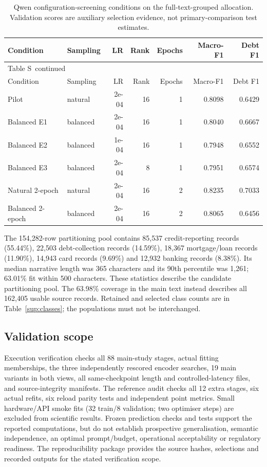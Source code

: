 \documentclass[10pt,a4paper]{article}
\renewcommand{\thetable}{S\arabic{table}}
\begin{document}
{\small
\setlength{\tabcolsep}{4pt}
\begin{longtable}{@{}llrrrrr@{}}
\caption{Qwen configuration-screening conditions on the full-text-grouped allocation. Validation scores are auxiliary selection evidence, not primary-comparison test estimates.}\label{sup:historical-selection}\\
\toprule
Condition & Sampling & LR & Rank & Epochs & Macro-F1 & Debt F1 \\
\midrule\endfirsthead
\multicolumn{7}{l}{\small Table \thetable\ continued}\\
\toprule
Condition & Sampling & LR & Rank & Epochs & Macro-F1 & Debt F1 \\
\midrule\endhead
\bottomrule\endfoot
Pilot & natural & 2e-04 & 16 & 1 & 0.8098 & 0.6429 \\
Balanced E1 & balanced & 2e-04 & 16 & 1 & 0.8040 & 0.6667 \\
Balanced E2 & balanced & 1e-04 & 16 & 1 & 0.7948 & 0.6552 \\
Balanced E3 & balanced & 2e-04 & 8 & 1 & 0.7951 & 0.6574 \\
Natural 2-epoch & natural & 2e-04 & 16 & 2 & 0.8235 & 0.7033 \\
Balanced 2-epoch & balanced & 2e-04 & 16 & 2 & 0.8065 & 0.6456 \\
\end{longtable}
}


The 154,282-row partitioning pool contains 85,537 credit-reporting records (55.44\%), 22,503 debt-collection records (14.59\%), 18,367 mortgage/loan records (11.90\%), 14,943 card records (9.69\%) and 12,932 banking records (8.38\%). Its median narrative length was 365 characters and its 90th percentile was 1,261; 63.01\% fit within 500 characters. These statistics describe the candidate partitioning pool. The 63.98\% coverage in the main text instead describes all 162,405 usable source records. Retained and selected class counts are in Table~\ref{sup:classes}; the populations must not be interchanged.

\subsection{Validation scope}
Execution verification checks all 88 main-study stages, actual fitting memberships, the three independently rescored encoder searches, 19 main variants in both views, all same-checkpoint length and controlled-latency files, and source-integrity manifests. The reference audit checks all 12 extra stages, six actual refits, six reload parity tests and independent point metrics. Small hardware/API smoke fits (32 train/8 validation; two optimiser steps) are excluded from scientific results. Frozen prediction checks and tests support the reported computations, but do not establish prospective generalisation, semantic independence, an optimal prompt/budget, operational acceptability or regulatory readiness. The reproducibility package provides the source hashes, selections and recorded outputs for the stated verification scope.
\end{document}
